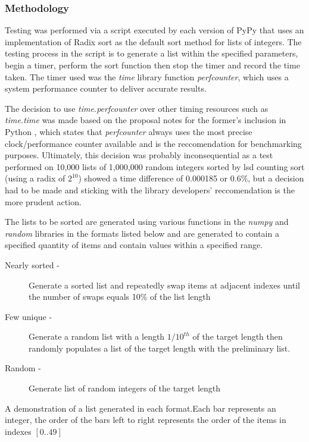 \documentclass[12pt]{article}
\begin{document}
\pagebreak
\subsubsection{Methodology}
\label{sssec:methodology}
Testing was performed via a script executed by each version of PyPy that uses an implementation of Radix sort as the default sort method for lists of integers. The testing process in the script is  to generate a list within the specified parameters, begin a timer, perform the sort function then stop the timer and record the time taken. The timer used was the \textit{time} library function \textit{perf\textunderscore counter}, which uses a system performance counter to deliver accurate results.
\par  
The decision to use \textit{time.perf\textunderscore counter} over other timing resources such as \textit{time.time} was made based on the proposal notes for the former's inclusion in Python \cite{PEP418}, which states that \textit{perf\textunderscore counter} always uses the most precise clock/performance counter available and is the reccomendation for benchmarking purposes. Ultimately, this decision was probably inconsequential as a test performed on 10,000 lists of 1,000,000 random integers sorted by lsd counting sort (using a radix of $2^{10}$) showed a time difference of 0.000185 or $0.6\%$, but a decision had to be made and sticking with the library developers' reccomendation is the more prudent action.
\par
The lists to be sorted are generated using various functions in the \textit{numpy} and \textit{random} libraries in the formats listed below and are generated to contain a specified quantity of items and contain values within a specified range.
\par
\begin{description}
	\item[Nearly sorted - ] Generate a sorted list and repeatedly swap items at adjacent indexes until the number of swaps equals 10\% of the list length
	\item[Few unique - ] Generate a random list with a length $1/10^{th}$ of the target length then randomly populates a list of the target length with the preliminary list.
	\item[Random - ] Generate list of random integers of the target length
\end{description} 
\begin{table}[h]
	\captionsetup{type=figure}
	\caption{A demonstration of a list generated in each format.\newline Each bar represents an integer, the order of the bars left to right represents the order of the items in indexes $[0..49]$}
\end{table}
\pagebreak
\end{document}
